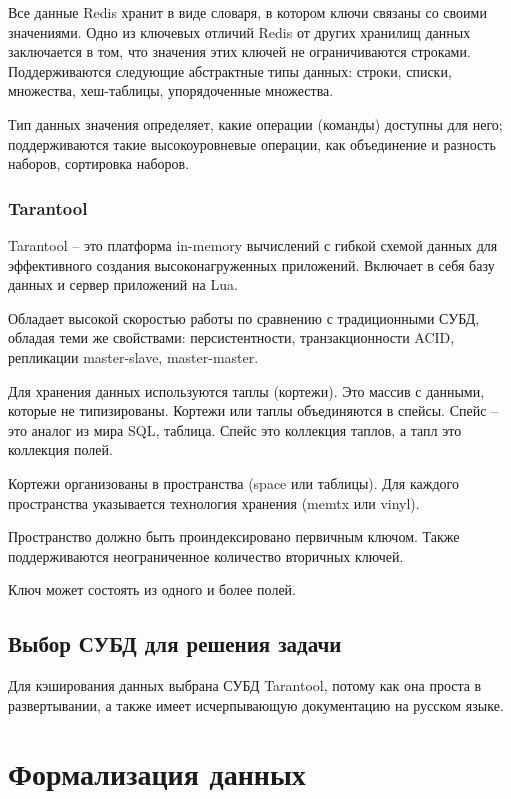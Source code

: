 Все данные Redis хранит в виде словаря, в котором ключи связаны со своими значениями. Одно из ключевых отличий Redis от других хранилищ данных заключается в том, что значения этих ключей не ограничиваются строками. Поддерживаются следующие абстрактные типы данных: строки, списки, множества, хеш-таблицы, упорядоченные множества.

Тип данных значения определяет, какие операции (команды) доступны для него; поддерживаются такие высокоуровневые операции, как объединение и разность наборов, сортировка наборов.

\subsubsection{Tarantool}

Tarantool \cite{tarantool} -- это платформа in-memory вычислений с гибкой схемой данных для эффективного создания высоконагруженных приложений. Включает в себя базу данных и сервер приложений на Lua.

Обладает высокой скоростью работы по сравнению с традиционными СУБД, обладая теми же свойствами: персистентности, транзакционности ACID, репликации master-slave, master-master.

Для хранения данных используются таплы (кортежи). Это массив с данными, которые не типизированы. Кортежи или таплы объединяются в спейсы. Спейс – это аналог из мира SQL, таблица. Спейс это коллекция таплов, а тапл это коллекция полей.

Кортежи организованы в пространства (space или таблицы). Для каждого пространства указывается технология хранения (memtx или vinyl).

Пространство должно быть проиндексировано первичным ключом. Также поддерживаются неограниченное количество вторичных ключей.

Ключ может состоять из одного и более полей.

\subsection{Выбор СУБД для решения задачи}

Для кэширования данных выбрана СУБД Tarantool, потому как она проста в развертывании, а также имеет исчерпывающую документацию на русском языке.

\section{Формализация данных}

